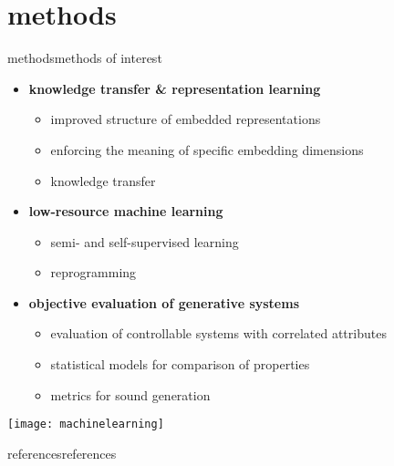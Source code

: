      \section[methods]{methods}
        \begin{frame}{methods}{methods of interest}
            \begin{itemize}
                \item   \textbf{knowledge transfer \& representation learning}
                    \begin{itemize}
                        \item   improved structure of embedded representations \cite{seshadri_improving_2021, ma_representation_2022}
                        \item   enforcing the meaning of specific embedding dimensions \cite{pati_attribute-based_2020, pati_is_2021}
                        \item   knowledge transfer \cite{hung_feature-informed_2022, ding_audio_2023, ding_embedding_2024}
                    \end{itemize}
                 \bigskip
                 \item<2->  \textbf{low-resource machine learning}
                    \begin{itemize}
                        \item   semi- and self-supervised learning \cite{gururani_semi-supervised_2021, wu_labeled_2018}
                        \item   reprogramming \cite{chen_music_2023, hung_low-resource_2023}
                    \end{itemize}
                 \bigskip
                 \item<3->  \textbf{objective evaluation of generative systems}
                    \begin{itemize}
                        \item   evaluation of controllable systems with correlated attributes \cite{watcharasupat_evaluation_2021, watcharasupat_latte_2022}
                        \item   statistical models for comparison of properties \cite{yang_evaluation_2020}
                        \item   metrics for sound generation \cite{vinay_evaluating_2022}
                    \end{itemize}
            \end{itemize}
            \vspace{-40mm}
            \begin{flushright}
                \texttt{[image: machinelearning]}
            \end{flushright}
            \end{frame}
        
    
    
    \begin{frame}[allowframebreaks]{references}{references}
    \tiny
        \printbibliography
    \end{frame}



